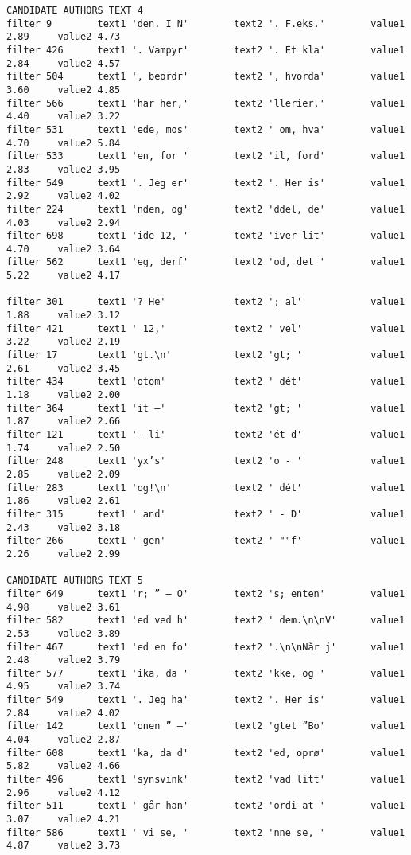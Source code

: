 {\begin{verbatim}
CANDIDATE AUTHORS TEXT 4
filter 9        text1 'den. I N'        text2 '. F.eks.'        value1 2.89     value2 4.73
filter 426      text1 '. Vampyr'        text2 '. Et kla'        value1 2.84     value2 4.57
filter 504      text1 ', beordr'        text2 ', hvorda'        value1 3.60     value2 4.85
filter 566      text1 'har her,'        text2 'llerier,'        value1 4.40     value2 3.22
filter 531      text1 'ede, mos'        text2 ' om, hva'        value1 4.70     value2 5.84
filter 533      text1 'en, for '        text2 'il, ford'        value1 2.83     value2 3.95
filter 549      text1 '. Jeg er'        text2 '. Her is'        value1 2.92     value2 4.02
filter 224      text1 'nden, og'        text2 'ddel, de'        value1 4.03     value2 2.94
filter 698      text1 'ide 12, '        text2 'iver lit'        value1 4.70     value2 3.64
filter 562      text1 'eg, derf'        text2 'od, det '        value1 5.22     value2 4.17

filter 301      text1 '? He'            text2 '; al'            value1 1.88     value2 3.12
filter 421      text1 ' 12,'            text2 ' vel'            value1 3.22     value2 2.19
filter 17       text1 'gt.\n'           text2 'gt; '            value1 2.61     value2 3.45
filter 434      text1 'otom'            text2 ' dét'            value1 1.18     value2 2.00
filter 364      text1 'it –'            text2 'gt; '            value1 1.87     value2 2.66
filter 121      text1 '– li'            text2 'ét d'            value1 1.74     value2 2.50
filter 248      text1 'yx’s'            text2 'o - '            value1 2.85     value2 2.09
filter 283      text1 'og!\n'           text2 ' dét'            value1 1.86     value2 2.61
filter 315      text1 ' and'            text2 ' - D'            value1 2.43     value2 3.18
filter 266      text1 ' gen'            text2 ' ""f'            value1 2.26     value2 2.99

CANDIDATE AUTHORS TEXT 5
filter 649      text1 'r; ” – O'        text2 's; enten'        value1 4.98     value2 3.61
filter 582      text1 'ed ved h'        text2 ' dem.\n\nV'      value1 2.53     value2 3.89
filter 467      text1 'ed en fo'        text2 '.\n\nNår j'      value1 2.48     value2 3.79
filter 577      text1 'ika, da '        text2 'kke, og '        value1 4.95     value2 3.74
filter 549      text1 '. Jeg ha'        text2 '. Her is'        value1 2.84     value2 4.02
filter 142      text1 'onen ” –'        text2 'gtet ”Bo'        value1 4.04     value2 2.87
filter 608      text1 'ka, da d'        text2 'ed, oprø'        value1 5.82     value2 4.66
filter 496      text1 'synsvink'        text2 'vad litt'        value1 2.96     value2 4.12
filter 511      text1 ' går han'        text2 'ordi at '        value1 3.07     value2 4.21
filter 586      text1 ' vi se, '        text2 'nne se, '        value1 4.87     value2 3.73


\end{verbatim}}
